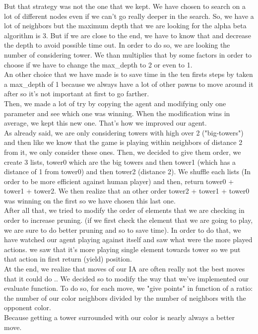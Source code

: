 \documentclass[10pt]{report}
\begin{document}
But that strategy was not the one that we kept. We have chosen to search on a lot of different nodes even if we can't go really deeper in the search. So, we have a lot of neighbors but the maximum depth that we are looking for the alpha beta algorithm is 3. But if we are close to the end, we have to know that and decrease the depth to avoid possible time out. In order to do so, we are looking the number of considering tower. We than multiplies that by some factors in order to choose if we have to change the max\_depth to 2 or even to 1.\\
An other choice that we have made is to save time in the ten firsts steps by taken a max\_depth of 1 because we always have a lot of other pawns to move around it after so it's not important at first to go farther.\\
Then, we made a lot of try by copying the agent and modifying only one parameter and see which one was winning. When the modification wins in average, we kept this new one. That's how we improved our agent.\\
As already said, we are only considering towers with high over 2 ("big-towers") and then like we know that the game is playing within neighbors of distance 2 from it, we only consider these ones. Then, we decided to give them order, we create 3 lists, tower0 which are the big towers and then tower1 (which has a distance of 1 from tower0) and then tower2 (distance 2). We shuffle each lists (In order to be more efficient against human player) and then, return tower0 + tower1 + tower2. We then realize that an other order 
tower2 + tower1 + tower0 was winning on the first so we have chosen this last one.\\

After all that, we  tried to modify the order of elements that we are checking in order to increase pruning. (if we first check the element that we are going to play, we are sure to do better pruning and so to save time). In order to do that, we have watched our agent playing against itself and saw what were the more played actions. we saw that it's more playing single element towards tower so we put that action in first return (yield) position.\\
At the end, we realize that moves of our IA are often really not the best moves that it could do .. We decided so to modify the way that we've implemented our evaluate function. To do so, for each move, we "give points" in function of a ratio: the number of our color neighbors divided by the number of neighbors with the opponent color.\\
 Because getting a tower surrounded with our color is nearly always a better move.
\end{document}
